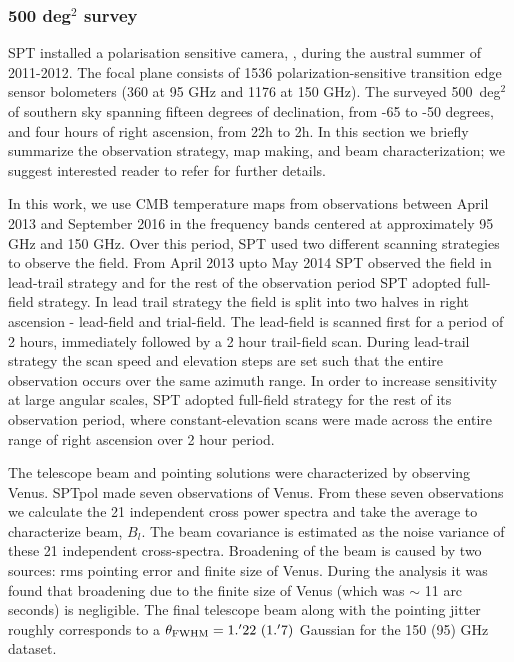 \subsubsection*{\sptpol{} {\rm 500} deg$^{2}$ survey}\label{sec_sptpol}
SPT installed a polarisation sensitive camera, \sptpol{}, during the austral summer of 2011-2012. 
The \sptpol{} focal plane consists of 1536 polarization-sensitive transition edge sensor bolometers (360 at 95 GHz and 1176 at 150 GHz)\citep{austermann12}.%
The \sptpol{}  surveyed 500~deg$^{2}$ of southern sky spanning fifteen degrees of declination, from -65 to -50 degrees, and four hours of right ascension, from 22h to 2h. 
In this section we briefly summarize the \sptpol{} observation strategy, map making, and beam characterization; we suggest interested reader to refer \cite{henning18} for further details. 

In this work, we use CMB temperature maps from observations between April 2013 and September 2016 in the frequency bands centered at approximately 95 GHz and 150 GHz.  Over this period, SPT used two different scanning strategies to observe the field. From April 2013 upto May 2014 SPT observed the field in lead-trail strategy and for the rest of the observation period SPT adopted full-field strategy. In lead trail strategy the field is split into two halves in right ascension - lead-field and trial-field. The lead-field is scanned first for a period of 2 hours, immediately followed by a 2 hour trail-field scan.  During lead-trail strategy the scan speed and elevation steps are set such that the entire observation occurs over the same azimuth range. In order to increase sensitivity at large angular scales, SPT adopted full-field strategy for the rest of its observation period, where constant-elevation scans were made across the entire range of right ascension over 2 hour period.


The telescope beam and pointing solutions were characterized by observing Venus.
  SPTpol made seven observations of Venus. From these seven observations we calculate the 21 independent cross power spectra and take the average to  characterize beam, $B_{l}$.
 The beam covariance is estimated as the noise variance of these 21 independent cross-spectra. 
 Broadening of the beam is caused by two sources: rms pointing error and finite size of Venus.
 During the analysis it was found that broadening due to the finite size of Venus (which was $\sim$ 11 arc seconds) is negligible.
The final telescope beam along with the pointing jitter roughly corresponds to a $\theta_{\rm FWHM} = 1.^{\prime}22\ (1.^{\prime}7)$ Gaussian for the 150 (95) GHz dataset.

